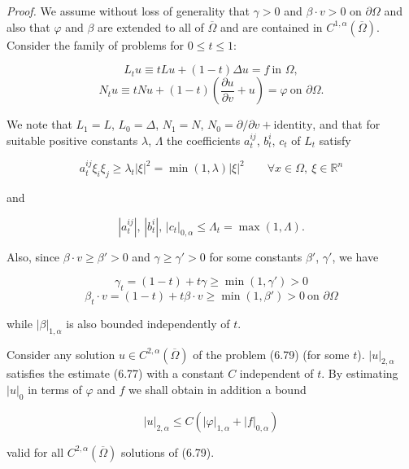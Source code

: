 \noindent\textit{Proof.} We assume without loss of generality that $\gamma>0$ and $\beta\cdot v>0$ on $\partial\Omega$ and also that $\varphi$ and $\beta$ are extended to all of $\overline{\Omega}$ and are contained in $C^{1,\alpha}(\overline{\Omega})$. Consider the family of problems for $0\leq t\leq 1$:

\[
L_tu \equiv tLu+(1-t)\Delta u=f \ \text{in }\Omega,
\]
\begin{equation}
\tag{6.79}
N_tu \equiv tNu+(1-t)\left(\frac{\partial u}{\partial v}+u\right)=\varphi \ \text{on }\partial\Omega.
\end{equation}

We note that $L_1=L$, $L_0=\Delta$, $N_1=N$, $N_0=\partial/\partial v+\text{identity}$, and that for suitable positive constants $\lambda$, $\Lambda$ the coefficients $a^{ij}_t$, $b^i_t$, $c_t$ of $L_t$ satisfy

\[
a^{ij}_t\xi_i\xi_j \geq \lambda_t|\xi|^2=\min(1,\lambda)|\xi|^2 \qquad \forall x\in\Omega,\ \xi\in\mathbb{R}^n
\]

and

\[
|a^{ij}_t|,\,|b^i_t|,\,|c_t|_{0,\alpha} \leq \Lambda_t=\max(1,\Lambda).
\]

Also, since $\beta\cdot v\geq \beta'>0$ and $\gamma\geq \gamma'>0$ for some constants $\beta'$, $\gamma'$, we have

\[
\gamma_t=(1-t)+t\gamma \geq \min(1,\gamma')>0
\]
\[
\beta_t\cdot v=(1-t)+t\beta\cdot v \geq \min(1,\beta')>0 \ \text{on }\partial\Omega
\]

while $|\beta|_{1,\alpha}$ is also bounded independently of $t$.

Consider any solution $u\in C^{2,\alpha}(\overline{\Omega})$ of the problem (6.79) (for some $t$). $|u|_{2,\alpha}$ satisfies the estimate (6.77) with a constant $C$ independent of $t$. By estimating $|u|_0$ in terms of $\varphi$ and $f$ we shall obtain in addition a bound

\begin{equation}
\tag{6.80}
|u|_{2,\alpha}\leq C\left(|\varphi|_{1,\alpha}+|f|_{0,\alpha}\right)
\end{equation}

valid for all $C^{2,\alpha}(\overline{\Omega})$ solutions of (6.79).



